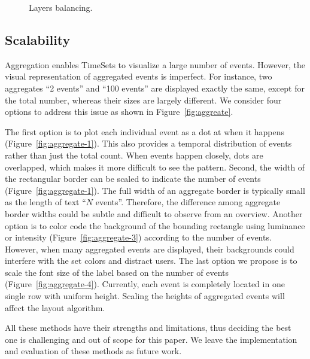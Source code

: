 \begin{figure}[!htb]
	\centering
	\hfill
	\caption{Layers balancing.}
	\label{fig:balancing}
\end{figure}

\subsection{Scalability}
Aggregation enables TimeSets to visualize a large number of events. However, the visual representation of aggregated events is imperfect. For instance, two aggregates ``2 events'' and ``100 events'' are displayed exactly the same, except for the total number, whereas their sizes are largely different. We consider four options to address this issue as shown in Figure~\ref{fig:aggreate}. 

The first option is to plot each individual event as a dot at when it happens (Figure~\ref{fig:aggregate-1}). This also provides a temporal distribution of events rather than just the total count. When events happen closely, dots are overlapped, which makes it more difficult to see the pattern. Second, the width of the rectangular border can be scaled to indicate the number of events (Figure~\ref{fig:aggregate-1}). The full width of an aggregate border is typically small as the length of text ``$N$ events''. Therefore, the difference among aggregate border widths could be subtle and difficult to observe from an overview. Another option is to color code the background of the bounding rectangle using luminance or intensity (Figure~\ref{fig:aggregate-3}) according to the number of events. However, when many aggregated events are displayed, their backgrounds could interfere with the set colors and distract users. The last option we propose is to scale the font size of the label based on the number of events (Figure~\ref{fig:aggregate-4}). Currently, each event is completely located in one single row with uniform height. Scaling the heights of aggregated events will affect the layout algorithm. 

All these methods have their strengths and limitations, thus deciding the best one is challenging and out of scope for this paper. We leave the implementation and evaluation of these methods as future work.

